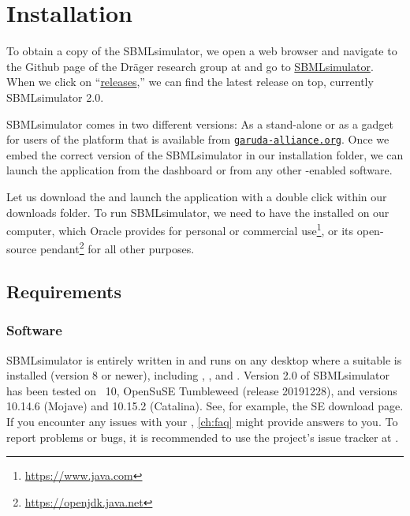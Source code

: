 
\chapter{Installation}

To obtain a copy of the SBMLsimulator, we open a web browser and navigate to the Github page of the Dräger research group at  and go to \href{https://github.com/draeger-lab/SBMLsimulator/}{SBMLsimulator}. When we click on ``\href{https://github.com/draeger-lab/SBMLsimulator/releases/}{releases},'' we can find the latest release on top, currently SBMLsimulator 2.0.

SBMLsimulator comes in two different versions: As a stand-alone \JAR or as a gadget for users of the \Garuda platform that is available from \href{http://garuda-alliance.org}{\texttt{garuda-alliance.org}}.
Once we embed the correct version of the SBMLsimulator in our \Garuda installation folder, we can launch the application from the \Garuda dashboard or from any other \Garuda-enabled software.

Let us download the \JAR and launch the application with a double click within our downloads folder.
To run SBMLsimulator, we need to have the \JVM installed on our computer, which Oracle provides for personal or commercial use\footnote{\url{https://www.java.com}}, or its open-source pendant\footnote{\url{https://openjdk.java.net}\label{fn:jvmldl}} for all other purposes.

\section{Requirements}
\subsection{Software}

SBMLsimulator is entirely written in \Java and runs on any desktop \OS
where a suitable \JVM is installed (\JDK version 8 or newer), including \Windows, \Linux, and \MacOSX.
Version 2.0 of SBMLsimulator has been tested on \Windows~10, OpenSuSE Tumbleweed (release 20191228), and
\MacOSX versions 10.14.6 (Mojave) and 10.15.2 (Catalina).
See, for example, the \Java SE download
page.
If you encounter any issues with your \OS, \cref{ch:faq} might provide answers to you.
To report problems or bugs, it is recommended to use the project's issue tracker at .


